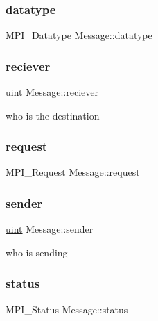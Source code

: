 \subsubsection{\texorpdfstring{datatype}{datatype}}
{\footnotesize\ttfamily M\+P\+I\+\_\+\+Datatype Message\+::datatype}

\mbox{\label{structMessage_a294808f8950df933fc36bf178f0b0608}} 
\subsubsection{\texorpdfstring{reciever}{reciever}}
{\footnotesize\ttfamily \mbox{\hyperlink{definitions_8h_a69aa29b598b851b0640aa225a9e5d61d}{uint}} Message\+::reciever}

who is the destination \mbox{\label{structMessage_a05ea0926cf9173c46d2284492530095a}} 
\subsubsection{\texorpdfstring{request}{request}}
{\footnotesize\ttfamily M\+P\+I\+\_\+\+Request Message\+::request}

\mbox{\label{structMessage_a377ce65ee6a414cb9ff14c344b34eda7}} 
\subsubsection{\texorpdfstring{sender}{sender}}
{\footnotesize\ttfamily \mbox{\hyperlink{definitions_8h_a69aa29b598b851b0640aa225a9e5d61d}{uint}} Message\+::sender}

who is sending \mbox{\label{structMessage_a45010e58ede78479ac2d94b99573cd2f}} 
\subsubsection{\texorpdfstring{status}{status}}
{\footnotesize\ttfamily M\+P\+I\+\_\+\+Status Message\+::status}

\mbox{\label{structMessage_ab84b0b508c7dd4e3852ea4f12b4afe07}} 
